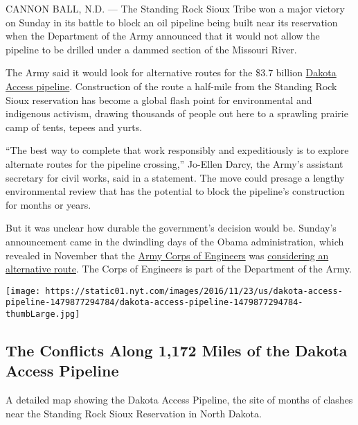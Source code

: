 CANNON BALL, N.D. --- The Standing Rock Sioux Tribe won a major victory
on Sunday in its battle to block an oil pipeline being built near its
reservation when the Department of the Army announced that it would not
allow the pipeline to be drilled under a dammed section of the Missouri
River.

The Army said it would look for alternative routes for the \$3.7 billion
\href{https://www.nytimes.com/2020/07/06/us/dakota-access-pipeline.html}{Dakota
Access pipeline}. Construction of the route a half-mile from the
Standing Rock Sioux reservation has become a global flash point for
environmental and indigenous activism, drawing thousands of people out
here to a sprawling prairie camp of tents, tepees and yurts.

``The best way to complete that work responsibly and expeditiously is to
explore alternate routes for the pipeline crossing,'' Jo-Ellen Darcy,
the Army's assistant secretary for civil works, said in a statement. The
move could presage a lengthy environmental review that has the potential
to block the pipeline's construction for months or years.

But it was unclear how durable the government's decision would be.
Sunday's announcement came in the dwindling days of the Obama
administration, which revealed in November that the
\href{http://topics.nytimes.com/top/reference/timestopics/organizations/a/army_corps_of_engineers/index.html?inline1=nyt\%2Dorg}{Army
Corps of Engineers} was
\href{http://www.nytimes.com/2016/11/03/us/president-obama-says-engineers-considering-alternate-route-for-dakota-pipeline.html}{considering
an alternative route}. The Corps of Engineers is part of the Department
of the Army.

\href{https://www.nytimes.com/interactive/2016/11/23/us/dakota-access-pipeline-protest-map.html}{}

\texttt{[image: https://static01.nyt.com/images/2016/11/23/us/dakota-access-pipeline-1479877294784/dakota-access-pipeline-1479877294784-thumbLarge.jpg]}

\hypertarget{the-conflicts-along-1172-miles-of-the-dakota-access-pipeline}{%
\subsection{The Conflicts Along 1,172 Miles of the Dakota Access
Pipeline}\label{the-conflicts-along-1172-miles-of-the-dakota-access-pipeline}}

A detailed map showing the Dakota Access Pipeline, the site of months of
clashes near the Standing Rock Sioux Reservation in North Dakota.

